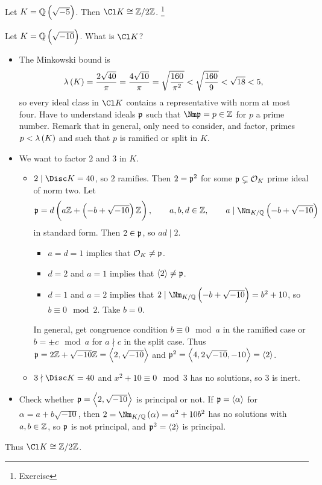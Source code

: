 \begin{example*}
Let $ K = \QQ\br{\sqrt{-5}} $. Then $ \Cl K \cong \ZZ / 2\ZZ $. \footnote{Exercise}
\end{example*}

\begin{example*}
Let $ K = \QQ\br{\sqrt{-10}} $. What is $ \Cl K $?
\begin{itemize}
\item The Minkowski bound is
$$ \lambda\br{K} = \dfrac{2\sqrt{40}}{\pi} = \dfrac{4\sqrt{10}}{\pi} = \sqrt{\dfrac{160}{\pi^2}} < \sqrt{\dfrac{160}{9}} < \sqrt{18} < 5, $$
so every ideal class in $ \Cl K $ contains a representative with norm at most four. Have to understand ideals $ \mathfrak{p} $ such that $ \Nm \ppp = p \in \ZZ $ for $ p $ a prime number. Remark that in general, only need to consider, and factor, primes $ p < \lambda\br{K} $ and such that $ p $ is ramified or split in $ K $.
\item We want to factor $ 2 $ and $ 3 $ in $ K $.
\begin{itemize}
\item $ 2 \mid \Disc K = 40 $, so $ 2 $ ramifies. Then $ 2 = \mathfrak{p}^2 $ for some $ \mathfrak{p} \subsetneq \mathcal{O}_K $ prime ideal of norm two. Let
$$ \ppp = d\br{a\ZZ + \br{-b + \sqrt{-10}}\ZZ}, \qquad a, b, d \in \ZZ, \qquad a \mid \Nm_{K / \QQ} \br{-b + \sqrt{-10}} $$
in standard form. Then $ 2 \in \mathfrak{p} $, so $ ad \mid 2 $.
\begin{itemize}
\item $ a = d = 1 $ implies that $ \mathcal{O}_K \ne \mathfrak{p} $.
\item $ d = 2 $ and $ a = 1 $ implies that $ \left\langle 2 \right\rangle \ne \mathfrak{p} $.
\item $ d = 1 $ and $ a = 2 $ implies that $ 2 \mid \Nm_{K / \QQ} \br{-b + \sqrt{-10}} = b^2 + 10 $, so $ b \equiv 0 \mod 2 $. Take $ b = 0 $.
\end{itemize}
In general, get congruence condition $ b \equiv 0 \mod a $ in the ramified case or $ b = \pm c \mod a $ for $ a \nmid c $ in the split case. Thus $ \mathfrak{p} = 2\mathbb{Z} + \sqrt{-10}\mathbb{Z} = \left\langle 2, \sqrt{-10} \right\rangle $ and $ \mathfrak{p}^2 = \left\langle 4, 2\sqrt{-10}, -10 \right\rangle = \left\langle 2 \right\rangle $.
\item $ 3 \nmid \Disc K = 40 $ and $ x^2 + 10 \equiv 0 \mod 3 $ has no solutions, so $ 3 $ is inert.
\end{itemize}
\item Check whether $ \mathfrak{p} = \left\langle 2, \sqrt{-10} \right\rangle $ is principal or not. If $ \mathfrak{p} = \left\langle \alpha \right\rangle $ for $ \alpha = a + b\sqrt{-10} $, then $ 2 = \Nm_{K / \QQ}\br{\alpha} = a^2 + 10b^2 $ has no solutions with $ a, b \in \mathbb{Z} $, so $ \mathfrak{p} $ is not principal, and $ \mathfrak{p}^2 = \left\langle 2 \right\rangle $ is principal.
\end{itemize}
Thus $ \Cl K \cong \ZZ / 2\ZZ $.
\end{example*}

